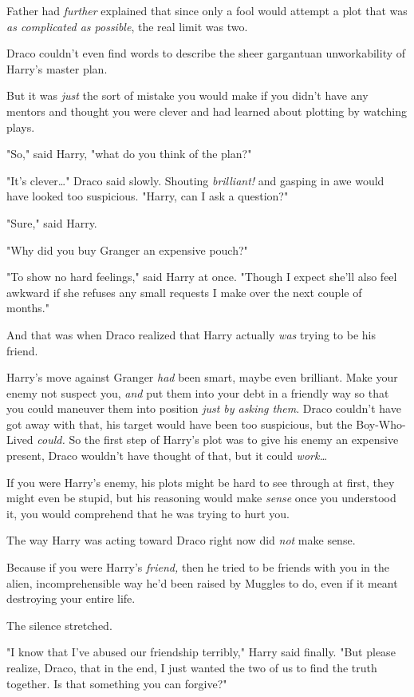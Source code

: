 Father had \emph{further} explained that since only a fool would attempt a plot
that was \emph{as complicated as possible}, the real limit was two.

Draco couldn't even find words to describe the sheer gargantuan unworkability
of Harry's master plan.

But it was \emph{just} the sort of mistake you would make if you didn't have
any mentors and thought you were clever and had learned about plotting by
watching plays.

"So," said Harry, "what do you think of the plan?"

"It's clever…" Draco said slowly. Shouting \emph{brilliant!} and gasping
in awe would have looked too suspicious. "Harry, can I ask a question?"

"Sure," said Harry.

"Why did you buy Granger an expensive pouch?"

"To show no hard feelings," said Harry at once. "Though I expect she'll also
feel awkward if she refuses any small requests I make over the next couple of
months."

And that was when Draco realized that Harry actually \emph{was} trying to be
his friend.

Harry's move against Granger \emph{had} been smart, maybe even brilliant. Make
your enemy not suspect you, \emph{and} put them into your debt in a friendly
way so that you could maneuver them into position \emph{just by asking them}.
Draco couldn't have got away with that, his target would have been too
suspicious, but the Boy-Who-Lived \emph{could.} So the first step of Harry's
plot was to give his enemy an expensive present, Draco wouldn't have thought of
that, but it could \emph{work…}

If you were Harry's enemy, his plots might be hard to see through at first,
they might even be stupid, but his reasoning would make \emph{sense} once you
understood it, you would comprehend that he was trying to hurt you.

The way Harry was acting toward Draco right now did \emph{not} make sense.

Because if you were Harry's \emph{friend,} then he tried to be friends with you
in the alien, incomprehensible way he'd been raised by Muggles to do, even if
it meant destroying your entire life.

The silence stretched.

"I know that I've abused our friendship terribly," Harry said finally. "But
please realize, Draco, that in the end, I just wanted the two of us to find the
truth together. Is that something you can forgive?"

